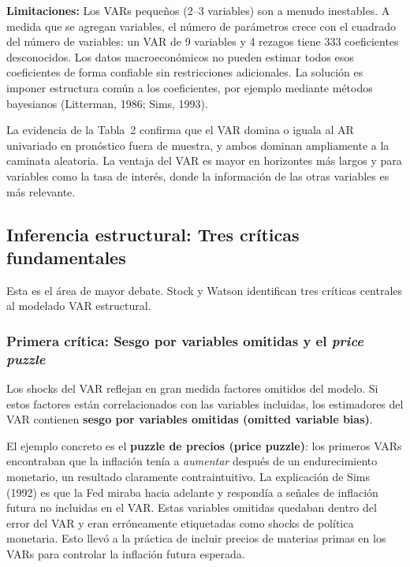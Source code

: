 \documentclass[12pt]{article}
\begin{document}
\textbf{Limitaciones:} Los VARs peque\~nos (2--3 variables) son a menudo inestables. A medida que se agregan variables, el n\'umero de par\'ametros crece con el cuadrado del n\'umero de variables: un VAR de 9 variables y 4 rezagos tiene 333 coeficientes desconocidos. Los datos macroecon\'omicos no pueden estimar todos esos coeficientes de forma confiable sin restricciones adicionales. La soluci\'on es imponer estructura com\'un a los coeficientes, por ejemplo mediante m\'etodos bayesianos (Litterman, 1986; Sims, 1993).

\begin{hallazgo}
La evidencia de la Tabla~2 confirma que el VAR domina o iguala al AR univariado en pron\'ostico fuera de muestra, y ambos dominan ampliamente a la caminata aleatoria. La ventaja del VAR es mayor en horizontes m\'as largos y para variables como la tasa de inter\'es, donde la informaci\'on de las otras variables es m\'as relevante.
\end{hallazgo}

\subsection{Inferencia estructural: Tres cr\'iticas fundamentales}

Esta es el \'area de mayor debate. Stock y Watson identifican tres cr\'iticas centrales al modelado VAR estructural.

\subsubsection{Primera cr\'itica: Sesgo por variables omitidas y el \textit{price puzzle}}

Los shocks del VAR reflejan en gran medida factores omitidos del modelo. Si estos factores est\'an correlacionados con las variables incluidas, los estimadores del VAR contienen \textbf{sesgo por variables omitidas (omitted variable bias)}.

El ejemplo concreto es el \textbf{puzzle de precios (price puzzle)}: los primeros VARs encontraban que la inflaci\'on ten\'ia a \textit{aumentar} despu\'es de un endurecimiento monetario, un resultado claramente contraintuitivo. La explicaci\'on de Sims (1992) es que la Fed miraba hacia adelante y respond\'ia a se\~nales de inflaci\'on futura no incluidas en el VAR. Estas variables omitidas quedaban dentro del error del VAR y eran err\'oneamente etiquetadas como shocks de pol\'itica monetaria. Esto llev\'o a la pr\'actica de incluir precios de materias primas en los VARs para controlar la inflaci\'on futura esperada.
\end{document}
